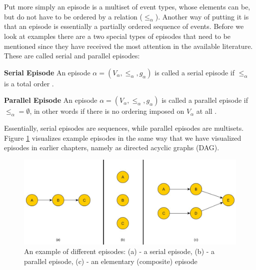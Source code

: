 Put more simply an episode is a multiset of event types, whose elements can be, but do not have to be ordered by a relation (${\leq}_{\alpha}$). Another way of putting it is that an episode is essentially a partially ordered sequence of events. Before we look at examples there are a two special types of episodes that need to be mentioned since they have received the most attention in the available literature. These are called serial and parallel episodes:

\begin{mydef}
\textbf{Serial Episode} An episode $\alpha = (V_\alpha,{\leq}_{\alpha},g_\alpha)$ is called a serial episode if ${\leq}_{\alpha}$ is a total order \cite{mannila1995discovering}.
\end{mydef}

\begin{mydef}
\textbf{Parallel Episode} An episode $\alpha = (V_\alpha,{\leq}_{\alpha},g_\alpha)$ is called a parallel episode if ${\leq}_{\alpha} = \emptyset$, in other words if there is no ordering imposed on $V_\alpha$ at all \cite{mannila1995discovering}.
\end{mydef}

Essentially, serial episodes are sequences, while parallel episodes are multisets. Figure \ref{fig_exampleEpisodes} visualizes example episodes in the same way that we have visualized episodes in earlier chapters, namely as directed acyclic graphs (DAG).

\begin{figure}[h]
	\centering
  	\includegraphics[width=\textwidth]{exampleEpisodes}
	\caption{An example of different episodes: (a) - a serial episode, (b) - a parallel episode, (c) - an elementary (composite) episode}
	\label{fig_exampleEpisodes}
\end{figure}

